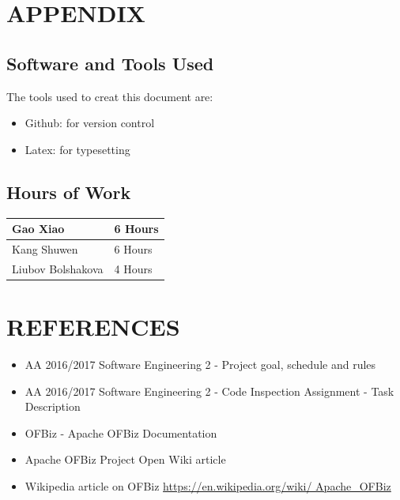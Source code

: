 \documentclass[a4paper,11pt]{article}
\begin{document}
	
\newpage	
\section{APPENDIX}

		\subsection{Software and Tools Used}
The tools used to creat this document are:
	\begin{itemize}
		\item Github: for version control
		\item Latex: for typesetting
		 
	\end{itemize}

		\subsection{Hours of Work}
\renewcommand\arraystretch{2}
\begin{tabular}{| p{5cm}| p{7cm}|}
 \hline
Gao Xiao& 6 Hours \\
 \hline
Kang Shuwen& 6 Hours \\
 \hline
Liubov Bolshakova& 4 Hours \\
 \hline

\end{tabular}
		
\newpage
\section{REFERENCES}
\begin{itemize}
\item AA 2016/2017 Software Engineering 2 - Project goal, schedule and rules
\item AA 2016/2017 Software Engineering 2 - Code Inspection Assignment -
Task Description
\item OFBiz - Apache OFBiz Documentation
\item Apache OFBiz Project Open Wiki article
\item Wikipedia article on OFBiz \url{https://en.wikipedia.org/wiki/ Apache_OFBiz}

\end{itemize}

\newpage
	
\end{document}
